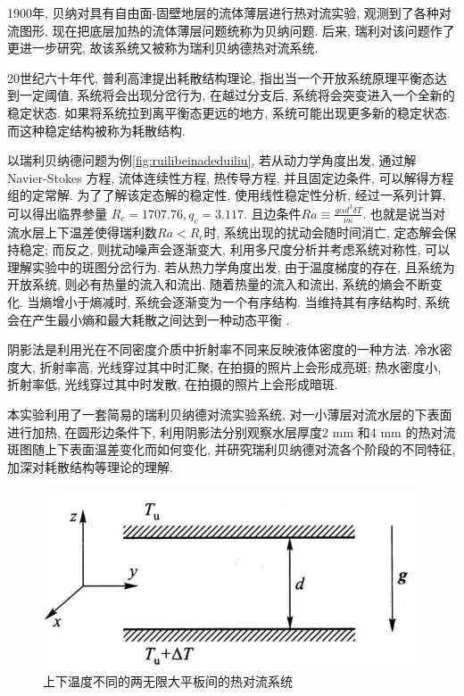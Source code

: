 \documentclass[font=default]{mpltx}
\begin{document}
  1900年, 贝纳对具有自由面-固壁地层的流体薄层进行热对流实验, 观测到了各种对流图形, 现在把底层加热的流体薄层问题统称为贝纳问题. 后来, 瑞利对该问题作了更进一步研究, 故该系统又被称为瑞利贝纳德热对流系统.
  \par
  20世纪六十年代, 普利高津提出耗散结构理论, 指出当一个开放系统原理平衡态达到一定阈值, 系统将会出现分岔行为, 在越过分支后, 系统将会突变进入一个全新的稳定状态. 
  如果将系统拉到离平衡态更远的地方, 系统可能出现更多新的稳定状态. 
  而这种稳定结构被称为耗散结构.
  \par
  以瑞利贝纳德问题为例\autoref{fig:ruilibeinadeduiliu}, 若从动力学角度出发, 通过解 Navier-Stokes 方程, 流体连续性方程, 热传导方程, 并且固定边条件, 可以解得方程组的定常解. 为了了解该定态解的稳定性, 使用线性稳定性分析, 经过一系列计算,
  可以得出临界参量
  $R_c = 1707.76, q_c = 3.117$.
  且边条件$Ra\equiv\frac{g\alpha d^3\delta T}{\nu\kappa}$.
  也就是说当对流水层上下温差使得瑞利数$Ra < R_c$时, 系统出现的扰动会随时间消亡, 定态解会保持稳定; 而反之, 则扰动噪声会逐渐变大, 利用多尺度分析并考虑系统对称性, 可以理解实验中的斑图分岔行为.
  若从热力学角度出发, 由于温度梯度的存在, 且系统为开放系统, 则必有热量的流入和流出. 随着热量的流入和流出, 系统的熵会不断变化. 当熵增小于熵减时, 系统会逐渐变为一个有序结构.
  当维持其有序结构时, 系统会在产生最小熵和最大耗散之间达到一种动态平衡 \cite{jindaiwulishiyan}.
  \par
  阴影法是利用光在不同密度介质中折射率不同来反映液体密度的一种方法. 冷水密度大, 折射率高, 光线穿过其中时汇聚, 在拍摄的照片上会形成亮斑; 热水密度小, 折射率低, 光线穿过其中时发散, 在拍摄的照片上会形成暗斑.
  \par
  本实验利用了一套简易的瑞利贝纳德对流实验系统, 对一小薄层对流水层的下表面进行加热, 在圆形边条件下, 利用阴影法分别观察水层厚度2 mm 和4 mm 的热对流斑图随上下表面温差变化而如何变化,
  并研究瑞利贝纳德对流各个阶段的不同特征, 加深对耗散结构等理论的理解.
  
  \begin{figure}[htbp]
    \centering
    \includegraphics[width=0.85\linewidth]{fig/ruilibeinadeduiliu.png}
    \caption{上下温度不同的两无限大平板间的热对流系统
      }

    \label{fig:ruilibeinadeduiliu}
  \end{figure}
\end{document}
